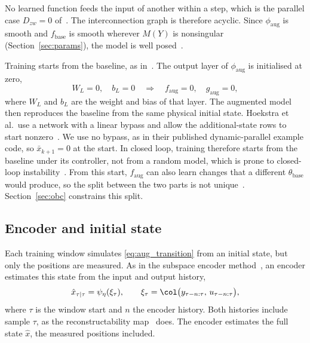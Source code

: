 No learned function feeds the input of another within a step, which is the
parallel case $D_{zw}=0$ of~\cite[Eq.~(5)]{hoekstra2026lfr}.
The interconnection graph is therefore acyclic.
Since $\phi_{\mathrm{aug}}$ is smooth and $f_{\mathrm{base}}$ is smooth
wherever $M(Y)$ is nonsingular (Section~\ref{sec:params}), the model is well
posed~\cite[Thm.~9, Remark~10]{hoekstra2026lfr}.

Training starts from the baseline, as in~\cite[Eq.~(29)]{hoekstra2026lfr}.
The output layer of $\phi_{\mathrm{aug}}$ is initialised at zero,
\begin{equation}
 W_L=0,\quad b_L=0
 \quad\Longrightarrow\quad
 f_{\mathrm{aug}}=0,\quad g_{\mathrm{aug}}=0 ,
 \label{eq:aug_zero_init}
\end{equation}
where $W_L$ and $b_L$ are the weight and bias of that layer.
The augmented model then reproduces the baseline from the same physical
initial state.
Hoekstra et al.\ use a network with a linear bypass and allow the
additional-state rows to start
nonzero~\cite[Eq.~(29), Sec.~5.4.3]{hoekstra2026lfr}.
We use no bypass, as in their published dynamic-parallel example code, so
$\bar x_{k+1}=0$ at the start.
In closed loop, training therefore starts from the baseline under its
controller, not from a random model, which is prone to closed-loop
instability~\cite[Sec.~5.3.2.2]{kessels2025ai}.
From this start, $f_{\mathrm{aug}}$ can also learn changes that a different
$\theta_{\mathrm{base}}$ would produce, so the split between the two parts
is not unique~\cite[Sec.~5.2]{hoekstra2026lfr}.
Section~\ref{sec:obc} constrains this split.

\subsection{Encoder and initial state}\label{sec:aug_encoder}
Each training window simulates \eqref{eq:aug_transition} from an initial
state, but only the positions are measured.
As in the subspace encoder method~\cite[Sec.~3]{beintema2023subnet}, an
encoder estimates this state from the input and output history,
\begin{equation}
 \hat x_{\tau|\tau}
 =\psi_\eta(\xi_\tau),\qquad
 \xi_\tau=\col\bigl(y_{\tau-n:\tau},\,u_{\tau-n:\tau}\bigr),
 \label{eq:aug_encoder}
\end{equation}
where $\tau$ is the window start and $n$ the encoder history.
Both histories include sample $\tau$, as the reconstructability
map~\cite[Eq.~(15)]{hoekstra2026encoder} does.
The encoder estimates the full state $\hat x$, the measured positions
included.

